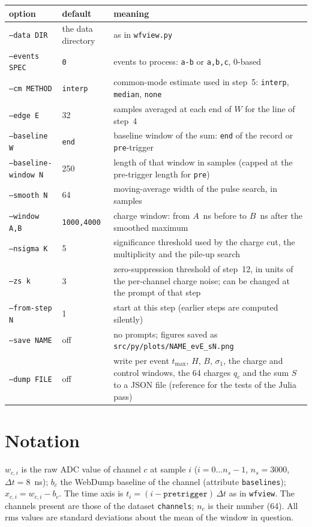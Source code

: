\documentclass[11pt]{article}
\newcommand{\code}[1]{\texttt{#1}}
\begin{document}
\begin{center}
\begin{tabular}{l l p{76mm}}
\toprule
option & default & meaning \\
\midrule
\code{--data DIR} & the data directory & as in \code{wfview.py} \\
\code{--events SPEC} & \code{0} & events to process: \code{a-b} or \code{a,b,c}, 0-based \\
\code{--cm METHOD} & \code{interp} & common-mode estimate used in step~5: \code{interp}, \code{median}, \code{none} \\
\code{--edge E} & 32 & samples averaged at each end of $W$ for the line of step~4 \\
\code{--baseline W} & \code{end} & baseline window of the sum: \code{end} of the record or \code{pre}-trigger \\
\code{--baseline-window N} & 250 & length of that window in samples (capped at the pre-trigger length for \code{pre}) \\
\code{--smooth N} & 64 & moving-average width of the pulse search, in samples \\
\code{--window A,B} & \code{1000,4000} & charge window: from $A$~ns before to $B$~ns after the smoothed maximum \\
\code{--nsigma K} & 5 & significance threshold used by the charge cut, the multiplicity and the pile-up search \\
\code{--zs k} & 3 & zero-suppression threshold of step~12, in units of the per-channel charge noise; can be changed at the prompt of that step \\
\code{--from-step N} & 1 & start at this step (earlier steps are computed silently) \\
\code{--save NAME} & off & no prompts; figures saved as \code{src/py/plots/NAME\_evE\_sN.png} \\
\code{--dump FILE} & off & write per event $t_{\max}$, $H$, $B$, $\sigma_1$, the charge and control windows, the 64 charges $q_c$ and the sum $S$ to a JSON file (reference for the tests of the Julia pass) \\
\bottomrule
\end{tabular}
\end{center}

\section{Notation}

$w_{c,i}$ is the raw ADC value of channel $c$ at sample $i$ ($i = 0 \dots
n_s-1$, $n_s = 3000$, $\Delta t = 8$~ns); $b_c$ the WebDump baseline of the
channel (attribute \code{baselines}); $x_{c,i} = w_{c,i} - b_c$. The time
axis is $t_i = (i - \code{pretrigger})\,\Delta t$ as in \code{wfview}. The
channels present are those of the dataset \code{channels}; $n_c$ is their
number (64). All rms values are standard deviations about the mean of the
window in question.
\end{document}
